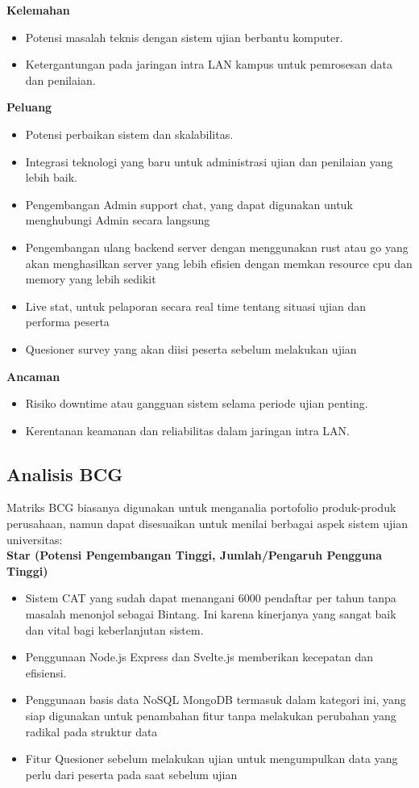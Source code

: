 \documentclass[12pt]{article}
\begin{document}
\textbf{Kelemahan}
\begin{itemize}
  \item Potensi masalah teknis dengan sistem ujian berbantu komputer.
  \item Ketergantungan pada jaringan intra LAN kampus untuk pemrosesan data dan penilaian.
\end{itemize}

\textbf{Peluang}
\begin{itemize}
  \item Potensi perbaikan sistem dan skalabilitas.
  \item Integrasi teknologi yang baru untuk administrasi ujian dan penilaian yang lebih baik.
  \item Pengembangan Admin support chat, yang dapat digunakan untuk menghubungi Admin secara langsung
  \item Pengembangan ulang backend server dengan menggunakan rust atau go yang akan menghasilkan server yang lebih efisien dengan memkan resource cpu dan memory yang lebih sedikit
  \item Live stat, untuk pelaporan secara real time tentang situasi ujian dan performa peserta
  \item Quesioner survey yang akan diisi peserta sebelum melakukan ujian
\end{itemize}

\textbf{Ancaman}
\begin{itemize}
  \item Risiko downtime atau gangguan sistem selama periode ujian penting.
  \item Kerentanan keamanan dan reliabilitas dalam jaringan intra LAN.
\end{itemize}

\subsection*{Analisis BCG}
Matriks BCG biasanya digunakan untuk menganalia portofolio produk-produk perusahaan, namun dapat disesuaikan untuk menilai berbagai aspek sistem ujian universitas:\\

\textbf{Star (Potensi Pengembangan Tinggi, Jumlah/Pengaruh Pengguna Tinggi)}
\begin{itemize}
  \item Sistem CAT yang sudah dapat menangani 6000 pendaftar per tahun tanpa masalah menonjol sebagai Bintang. Ini karena kinerjanya yang sangat baik dan vital bagi keberlanjutan sistem.
  \item Penggunaan Node.js Express dan Svelte.js memberikan kecepatan dan efisiensi.
  \item Penggunaan basis data NoSQL MongoDB termasuk dalam kategori ini, yang siap digunakan untuk penambahan fitur tanpa melakukan perubahan yang radikal pada struktur data
  \item Fitur Quesioner sebelum melakukan ujian untuk mengumpulkan data yang perlu dari peserta pada saat sebelum ujian
\end{itemize}
\end{document}
